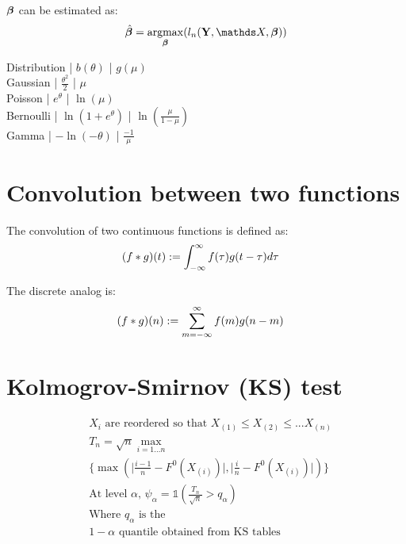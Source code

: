 $\bm{\beta}$ can be estimated as:
\begin {equation} \begin {split}
& \hat \vbeta = \argmax_{\vbeta} (l_n(\vY, \mX, \vbeta)) \\
\end {split} \end {equation}

 Distribution | $b(\theta)$ | $g(\mu)$ \\
 Gaussian | $ \frac {\theta^2} {2}$ | $ \mu $ \\
 Poisson | $ e^{\theta} $ | $ \ln(\mu) $ \\
 Bernoulli | $ \ln (1 + e^{\theta}) $ | $ \ln (\frac {\mu} {1 - \mu}) $ \\
 Gamma | $ -\ln (-\theta) $ | $ \frac {-1} {\mu} $ \\

\section {Convolution between two functions} 
The convolution of two continuous functions is defined as:
\begin{equation} \begin {split}
& ({f * g}) (t) := \int_{- \infty}^{\infty} f(\tau) g(t - \tau) d\tau
\end {split} \end{equation} 

The discrete analog is:
\begin{equation} \begin {split}
& ({f * g}) (n) := \sum_{m = -\infty}^{\infty} f(m) g(n - m)
\end {split} \end{equation}

\section {Kolmogrov-Smirnov (KS) test}
\begin {equation} 
\begin {split}
& \text {$X_i$ are reordered so that } X_{(1)} \le X_{(2)} \le ... X_{(n)} \\
& T_n = \sqrt{n} \max \limits_{i=1...n} \\
& \{ \max (\lvert \frac {i-1}{n} - F^0(X_{(i)}) \rvert , \lvert \frac {i}{n} - F^0(X_{(i)}) \rvert ) \} \\
& \text {At level $\alpha$, } \psi_{\alpha}  = \mathds{1} (\frac {T_n}{\sqrt{n}} > q_{\alpha}) \\
& \text {Where $q_{\alpha}$ is the} \\
& \text {$1 - \alpha$ quantile obtained from KS tables} \\
\end {split}
\end {equation}

